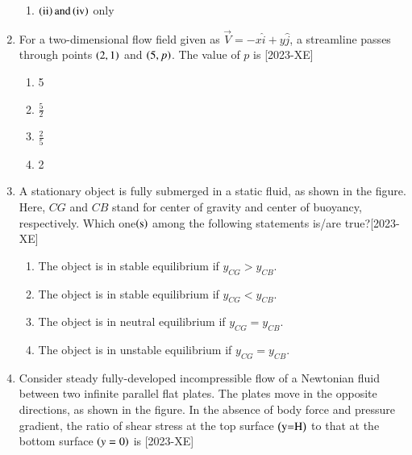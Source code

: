 \documentclass[journal]{IEEEtran}
\begin{document}
\begin{enumerate}[start=27]
\begin{enumerate}
    \item $\left(\text{ii}\right) \text{and} \left(\text{iv}\right)$ only
\end{enumerate}
\item For a two-dimensional flow field given as $\overset{\rightarrow}{V}=-x \hat{i} + y \hat{j}$, a streamline passes through points $\left(2,1\right)$ and $\left(5,p\right)$. The value of $p$ is \hfill{[2023-XE]}\\
\begin{enumerate}
    \item 5\\
    \item $\frac{5}{2}$\\
    \item $\frac{2}{5}$\\
    \item 2
\end{enumerate}
\item A stationary object is fully submerged in a static fluid, as shown in the figure. Here, $CG$ and $CB$ stand for center of gravity and center of buoyancy, respectively. Which one$\left(\text{s}\right)$ among the following statements is/are true?\hfill{[2023-XE]}\\
\begin{figure}[H]
			\centering
			
			\label{30}
		\end{figure}
\begin{enumerate}
    \item The object is in stable equilibrium if $y_{CG}>y_{CB}$.\\
    \item The object is in stable equilibrium if $y_{CG}<y_{CB}$.\\
    \item The object is in neutral equilibrium if $y_{CG}=y_{CB}$.\\
    \item The object is in unstable equilibrium if $y_{CG}=y_{CB}$.\\
\end{enumerate}
\item Consider steady fully-developed incompressible flow of a Newtonian fluid between two infinite parallel flat plates. The plates move in the opposite directions, as shown in the figure. In the absence of body force and pressure gradient, the ratio of shear stress at the top surface $\left(\text{y=H}\right)$ to that at the bottom surface $\left(y=0\right)$ is \hfill{[2023-XE]}\\
\begin{figure}[H]

\end{figure}
\end{enumerate}
\end{document}
